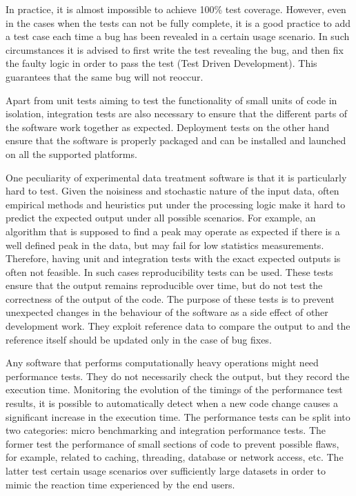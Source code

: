 \documentclass[jnr]{iosart2x}
\begin{document}
In practice, it is almost impossible to achieve 100\% test coverage.
However, even in the cases when the tests can not be fully complete, it is a good practice to add a test case each time a bug has been revealed in a certain usage scenario.
In such circumstances it is advised to first write the test revealing the bug, and then fix the faulty logic in order to pass the test (Test Driven Development).
This guarantees that the same bug will not reoccur.

Apart from unit tests aiming to test the functionality of small units of code in isolation, integration tests are also necessary to ensure that the different parts of the software work together as expected.
Deployment tests on the other hand ensure that the software is properly packaged and can be installed and launched on all the supported platforms.

One peculiarity of experimental data treatment software is that it is particularly hard to test.
Given the noisiness and stochastic nature of the input data, often empirical methods and heuristics put under the processing logic make it hard to predict the expected output under all possible scenarios.
For example, an algorithm that is supposed to find a peak may operate as expected if there is a well defined peak in the data, but may fail for low statistics measurements.
Therefore, having unit and integration tests with the exact expected outputs is often not feasible.
In such cases reproducibility tests can be used. 
These tests ensure that the output remains reproducible over time, but do not test the correctness of the output of the code.
The purpose of these tests is to prevent unexpected changes in the behaviour of the software as a side effect of other development work.
They exploit reference data to compare the output to and the reference itself should be updated only in the case of bug fixes.

Any software that performs computationally heavy operations might need performance tests.
They do not necessarily check the output, but they record the execution time.
Monitoring the evolution of the timings of the performance test results, it is possible to automatically detect when a new code change causes a significant increase in the execution time.
The performance tests can be split into two categories: micro benchmarking and integration performance tests.
The former test the performance of small sections of code to prevent possible flaws, for example, related to caching, threading, database or network access, etc.
The latter test certain usage scenarios over sufficiently large datasets in order to mimic the reaction time  experienced by the end users.
\end{document}
